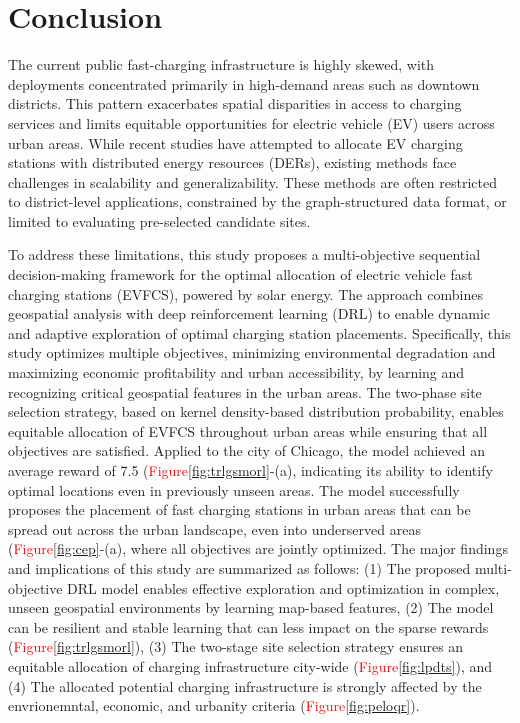 \documentclass[preprint,12pt]{elsarticle}
\begin{document}
\section{Conclusion}
The current public fast-charging infrastructure is highly skewed, with deployments concentrated primarily in high-demand areas such as downtown districts. This pattern exacerbates spatial disparities in access to charging services and limits equitable opportunities for electric vehicle (EV) users across urban areas. While recent studies have attempted to allocate EV charging stations with distributed energy resources (DERs), existing methods face challenges in scalability and generalizability. These methods are often restricted to district-level applications, constrained by the graph-structured data format, or limited to evaluating pre-selected candidate sites. 

To address these limitations, this study proposes a multi-objective sequential decision-making framework for the optimal allocation of electric vehicle fast charging stations (EVFCS), powered by solar energy. The approach combines geospatial analysis with deep reinforcement learning (DRL) to enable dynamic and adaptive exploration of optimal charging station placements. Specifically, this study optimizes multiple objectives, minimizing environmental degradation and maximizing economic profitability and urban accessibility, by learning and recognizing critical geospatial features in the urban areas. The two-phase site selection strategy, based on kernel density-based distribution probability, enables equitable allocation of EVFCS throughout urban areas while ensuring that all objectives are satisfied. Applied to the city of Chicago, the model achieved an average reward of 7.5 (\textcolor{red}{Figure}\ref{fig:trlgsmorl}-(a), indicating its ability to identify optimal locations even in previously unseen areas. The model successfully proposes the placement of fast charging stations in urban areas that can be spread out across the urban landscape, even into underserved areas (\textcolor{red}{Figure}\ref{fig:cep}-(a), where all objectives are jointly optimized. The major findings and implications of this study are summarized as follows: (1) The proposed multi-objective DRL model enables effective exploration and optimization in complex, unseen geospatial environments by learning map-based features, (2) The model can be resilient and stable learning that can less impact on the sparse rewards (\textcolor{red}{Figure}\ref{fig:trlgsmorl}), (3) The two-stage site selection strategy ensures an equitable allocation of charging infrastructure city-wide (\textcolor{red}{Figure}\ref{fig:lpdts}), and (4) The allocated potential charging infrastructure is strongly affected by the envrionemntal, economic, and urbanity criteria (\textcolor{red}{Figure}\ref{fig:peloqr}).
\end{document}
